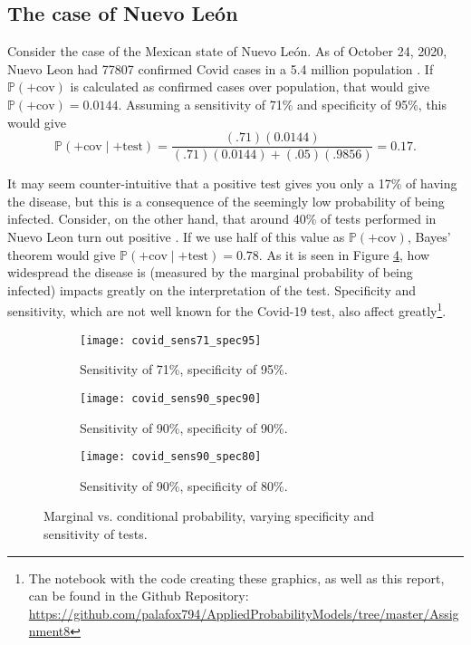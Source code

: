 \documentclass[letterpaper, 10 pt, conference]{article}
\renewcommand{\P}{\ensuremath{\mathbb{P}}}
\newcommand\cov{\ensuremath{\mathrm{cov}}}
\newcommand\tst{\ensuremath{\mathrm{test}}}
\begin{document}
\subsection{The case of Nuevo León}
 Consider the case of the Mexican state of Nuevo León. As of October 24, 2020, Nuevo Leon had 77807 confirmed Covid cases in a 5.4 million population \citep{casos_covid_nl, datos_nl}.  If $\P(+\cov)$ is calculated as confirmed cases over population, that would give $\P(+\cov) = 0.0144$.  Assuming a sensitivity of 71\% and specificity of 95\%, this would give 
\begin{equation}	
	\P(+\cov \mid +\tst) = \frac{(.71) (0.0144)}{(.71)(0.0144) + (.05)(.9856)} = 0.17.
\end{equation}

It may seem counter-intuitive that a positive test gives you only a 17\% of having the disease, but this is a consequence of the seemingly low probability of being infected. Consider, on the other hand, that around 40\% of tests performed in Nuevo Leon turn out positive \citep{indicadores_nl}. If we use half of this value as $\P(+\cov)$, Bayes' theorem would give $\P(+\cov \mid +\tst) = 0.78$. As it is seen in Figure \ref{fig:covid}, how widespread the disease is (measured by the marginal probability of being infected) impacts greatly on the interpretation of the test. Specificity and sensitivity, which are not well known for the Covid-19 test, also affect greatly\footnote{The notebook with the code creating these graphics, as well as this report, can be found in the Github Repository: \url{https://github.com/palafox794/AppliedProbabilityModels/tree/master/Assignment8}}. 

\begin{figure}
	\centering
	\begin{subfigure}{0.3\linewidth}
		\texttt{[image: covid\_sens71\_spec95]}
		\caption{Sensitivity of 71\%, specificity of 95\%.}
		\label{fig:covid_sens71_spec95}
	\end{subfigure}
	\hfill
	\begin{subfigure}{0.3\linewidth}
		\texttt{[image: covid\_sens90\_spec90]}
		\caption{Sensitivity of 90\%, specificity of 90\%.}
		\label{fig:covid_sens90_spec90}
	\end{subfigure}
	\hfill
	\begin{subfigure}{0.3\linewidth}
		\texttt{[image: covid\_sens90\_spec80]}
		\caption{Sensitivity of 90\%, specificity of 80\%.}
		\label{fig:covid_sens90_spec80}
	\end{subfigure}
	\caption{Marginal vs. conditional probability, varying specificity and sensitivity of tests.} 
	\label{fig:covid}
\end{figure}
\end{document}
